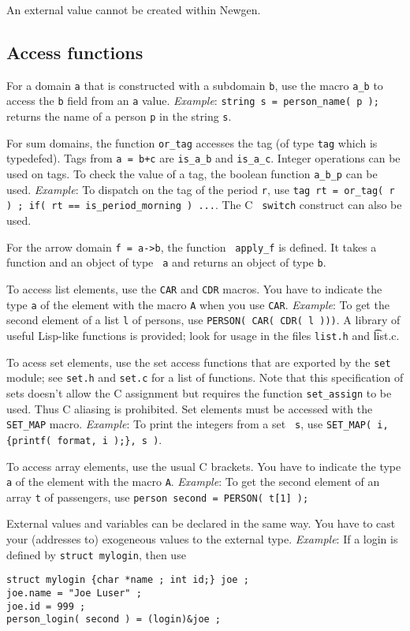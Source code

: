 An external value cannot be created within Newgen.

\subsection{Access functions}

For a domain {\tt a} that is constructed with a subdomain {\tt b}, use
the macro {\tt a\_b} to access the {\tt b} field from an {\tt a} value.
{\em Example}: {\tt string s = person\_name( p );} returns the name of a
person {\tt p} in the string {\tt s}.  

For sum domains, the function {\tt or\_tag} accesses the tag (of type
{\tt tag} which is typedefed). Tags from {\tt a = b+c} are {\tt is\_a\_b}
and {\tt is\_a\_c}. Integer operations can be used on tags. To check the
value of a tag, the boolean function {\tt a\_b\_p} can be used.  {\em
Example}: To dispatch on the tag of the period {\tt r}, use {\tt tag rt
= or\_tag( r ) ; if( rt == is\_period\_morning ) ...}. The C {\tt
switch} construct can also be used.

For the arrow domain {\tt f = a\verb:->:b}, the function {\tt
apply\_f} is defined. It takes a function and an object of type {\tt
a} and returns an object of type {\tt b}.

To access list elements, use the {\tt CAR} and {\tt CDR} macros. You have to
indicate the type {\tt a} of the element with the macro {\tt A} when you
use {\tt CAR}.
{\em Example}: To get the second element of a list {\tt l} of persons,
use {\tt PERSON( CAR( CDR( l )))}. A library of useful Lisp-like
functions is provided; look for usage in the files {\tt list.h} and {\t
list.c}. 

To acess set elements, use the set access functions that are exported by
the {\tt set} module; see {\tt set.h} and {\tt set.c} for a list of
functions. Note that this specification of sets doesn't allow the C
assignment but requires the function {\tt set\_assign} to be used. Thus
C aliasing is prohibited. Set elements must be accessed with the {\tt
SET\_MAP} macro.  {\em Example}: To print the integers from a set {\tt
s}, use {\tt SET\_MAP( i, \{printf( format, i );\}, s )}.

To access array elements, use the usual C brackets. You have to indicate
the type {\tt a} of the element with the macro {\tt A}.
{\em Example}: To get the second element of an array {\tt t} of passengers,
use {\tt person second = PERSON( t[1] );}

External values and variables can be declared in the same way. You have
to cast your (addresses to) exogeneous values to the external type.
{\em Example}: If a login is defined by {\tt struct mylogin}, then use
\begin{verbatim}
struct mylogin {char *name ; int id;} joe ;
joe.name = "Joe Luser" ;
joe.id = 999 ;
person_login( second ) = (login)&joe ;
\end{verbatim}


